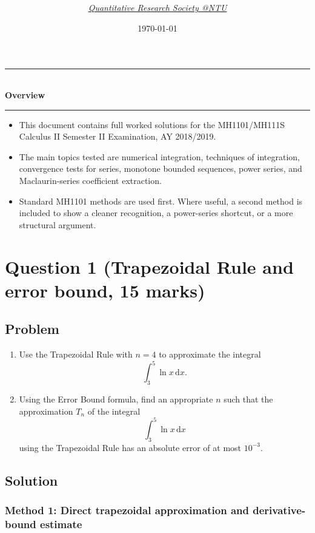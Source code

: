 \documentclass[12pt]{article}
\title{
\Huge \CourseCode\ \CourseName \\[0.3em]
\Large \DocType \\[0.3em]
\large \ExamMeta
}
\author{
  \textit{\href{https://qrsntu.org}{Quantitative Research Society @NTU}}
}
\date{\today}
\newcommand{\dd}{\,\mathrm{d}}
\newenvironment{overview}{
  \par\bigskip
  \begin{center}
    \rule{0.92\linewidth}{0.6pt}\\[-0.2em]
    \textbf{Overview}\\[-0.2em]
    \rule{0.92\linewidth}{0.6pt}
  \end{center}
  \vspace{-0.3em}
  \begin{itemize}[leftmargin=1.6em, itemsep=0.2em, topsep=0.2em]
}{
  \end{itemize}
  \par\bigskip
}
\begin{document}
\maketitle
\thispagestyle{plainfirst}
\pagestyle{main}

\begin{overview}
  \item This document contains full worked solutions for the MH1101/MH111S Calculus II Semester II Examination, AY 2018/2019.
  \item The main topics tested are numerical integration, techniques of integration, convergence tests for series, monotone bounded sequences, power series, and Maclaurin-series coefficient extraction.
  \item Standard MH1101 methods are used first. Where useful, a second method is included to show a cleaner recognition, a power-series shortcut, or a more structural argument.
\end{overview}

\newpage
\tableofcontents

\newpage
\section{Question 1 (Trapezoidal Rule and error bound, 15 marks)}

\subsection{Problem}

\begin{enumerate}[label=(\alph*)]
\item Use the Trapezoidal Rule with $n=4$ to approximate the integral
\[
\int_3^5 \ln x \dd x.
\]

\item Using the Error Bound formula, find an appropriate $n$ such that the approximation $T_n$ of the integral
\[
\int_3^5 \ln x \dd x
\]
using the Trapezoidal Rule has an absolute error of at most $10^{-3}$.
\end{enumerate}

\newpage
\subsection{Solution}

\subsubsection{Method 1: Direct trapezoidal approximation and derivative-bound estimate}
\end{document}

